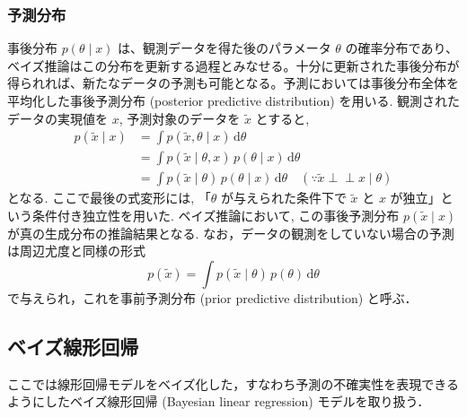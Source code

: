 \documentclass[titlepage]{ltjsbook}
\begin{document}
\subsubsection{予測分布}
事後分布 $p(\theta \mid x)$ は、観測データを得た後のパラメータ $\theta$ の確率分布であり、ベイズ推論はこの分布を更新する過程とみなせる。十分に更新された事後分布が得られれば、新たなデータの予測も可能となる。予測においては事後分布全体を平均化した事後予測分布 (posterior predictive distribution) を用いる. 観測されたデータの実現値を $x$, 予測対象のデータを $\tilde{x}$ とすると, 
\begin{align}
p(\tilde{x} \mid x)
&= \int p(\tilde{x}, \theta \mid x) \, \mathrm{d}\theta\\
&= \int p(\tilde{x} \mid \theta, x) \, p(\theta \mid x) \, \mathrm{d}\theta \\
&= \int p(\tilde{x} \mid \theta) \, p(\theta \mid x) \, \mathrm{d}\theta
\quad (\because \tilde{x} \perp\!\!\!\perp x \mid \theta)
\end{align}
となる. ここで最後の式変形には, 「$\theta$ が与えられた条件下で $\tilde{x}$ と $x$ が独立」という条件付き独立性を用いた. ベイズ推論において, この事後予測分布 $p(\tilde{x} \mid x)$ が真の生成分布の推論結果となる. なお，データの観測をしていない場合の予測は周辺尤度と同様の形式
\begin{equation}
p(\tilde{x}) = \int p(\tilde{x} \mid \theta)\, p(\theta)\, \mathrm{d}\theta
\end{equation}
で与えられ，これを事前予測分布 (prior predictive distribution) と呼ぶ．

\subsection{ベイズ線形回帰}
ここでは線形回帰モデルをベイズ化した，すなわち予測の不確実性を表現できるようにしたベイズ線形回帰 (Bayesian linear regression) モデルを取り扱う．
\end{document}
